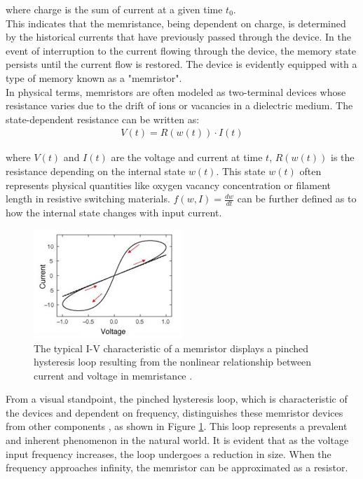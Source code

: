 \noindent where charge is the sum of current at a given time $t_0$.  \\

\noindent This indicates that the memristance, being dependent on charge, is determined by the historical currents that have previously passed through the device. In the event of interruption to the current flowing through the device, the memory state persists until the current flow is restored. The device is evidently equipped with a type of memory known as a "memristor".\\

\noindent In physical terms, memristors are often modeled as two-terminal devices whose resistance varies due to the drift of ions or vacancies in a dielectric medium. The state-dependent resistance can be written as:
\begin{align}
    V(t) = R(w(t)) \cdot I(t) \label{eq:1.24}
\end{align}

\noindent where $V(t)$ and $I(t)$ are the voltage and current at time $t$, $R(w(t))$ is the resistance depending on the internal state $w(t)$. This state $w(t)$ often represents physical quantities like oxygen vacancy concentration or filament length in resistive switching materials. $f(w, I) = \frac{dw}{dt}$ can be further defined as to how the internal state changes with input current. \\

\begin{figure}[htbp!] 
    \centering    
    \includegraphics[width=0.5\textwidth]{Chapter1/Figs/1f.png}
    \caption[Typical I-V characteristic of a memristor]{The typical I-V characteristic  of a memristor displays a pinched hysteresis loop resulting from the nonlinear relationship between current and voltage in memristance \cite{wen2012dynamics}.}
    \label{fig:1f}
\end{figure}
    
\noindent From a visual standpoint, the pinched hysteresis loop, which is characteristic of the devices and dependent on frequency, distinguishes these memristor devices from other components \cite{chua2019resistance}, as shown in Figure \ref{fig:1f}. This loop represents a prevalent and inherent phenomenon in the natural world. It is evident that as the voltage input frequency increases, the loop undergoes a reduction in size. When the frequency approaches infinity, the memristor can be approximated as a resistor.\\

